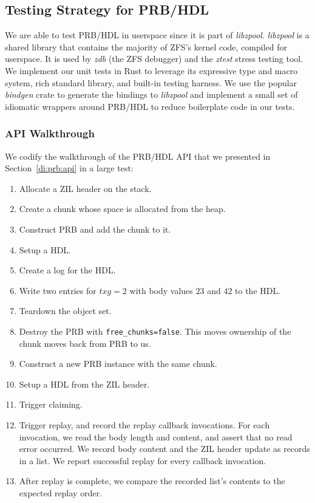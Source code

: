 \documentclass[12pt,a4paper,twoside]{book}
\begin{document}
\subsection{Testing Strategy for PRB/HDL}\label{sec:eval:correctness:prb}

We are able to test PRB/HDL in userspace since it is part of \textit{libzpool}.
\textit{libzpool} is a shared library that contains the majority of ZFS's kernel code, compiled for userspace.
It is used by \textit{zdb} (the ZFS debugger) and the \textit{ztest} stress testing tool.
We implement our unit tests in Rust to leverage its expressive type and macro system, rich standard library, and built-in testing harness.
We use the popular \textit{bindgen} crate to generate the bindings to \textit{libzpool} and implement a small set of idiomatic wrappers around PRB/HDL to reduce boilerplate code in our tests.

\subsubsection{API Walkthrough}
We codify the walkthrough of the PRB/HDL API that we presented in Section~\ref{di:prb:api} in a large test:
\begin{enumerate}[noitemsep]
    \item Allocate a ZIL header on the stack.
    \item Create a chunk whose space is allocated from the heap.
    \item Construct PRB and add the chunk to it.
    \item Setup a HDL.
    \item Create a log for the HDL.
    \item Write two entries for $txg=2$ with body values $23$ and $42$ to the HDL.
    \item Teardown the object set.
    \item Destroy the PRB with \lstinline{free_chunks=false}. This moves ownership of the chunk moves back from PRB to us.
    \item Construct a new PRB instance with the same chunk.
    \item Setup a HDL from the ZIL header.
    \item Trigger claiming.
    \item Trigger replay, and record the replay callback invocations.
        For each invocation, we read the body length and content, and assert that no read error occurred.
        We record body content and the ZIL header update as records in a list.
        We report successful replay for every callback invocation.
    \item After replay is complete, we compare the recorded list's contents to the expected replay order.
\end{enumerate}
\end{document}

